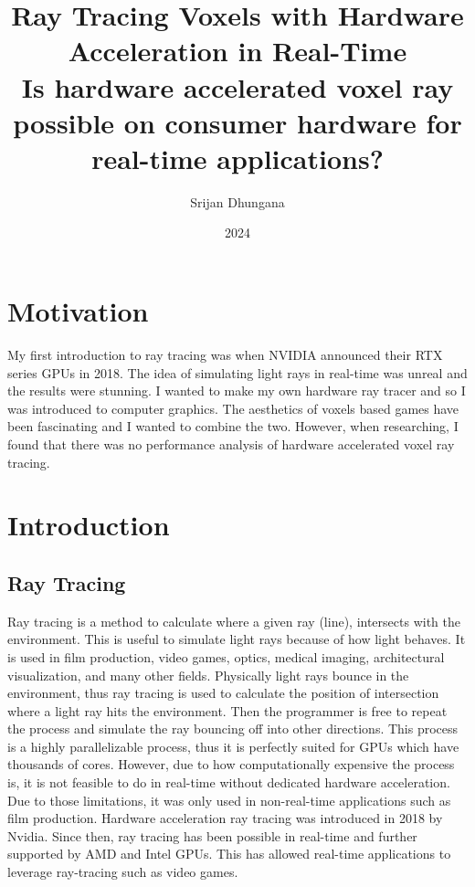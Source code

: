 \documentclass[12pt]{article}
\title{Ray Tracing Voxels with Hardware Acceleration in Real-Time \\
    \vspace{1cm}
    \large Is hardware accelerated voxel ray possible on consumer hardware for real-time applications?}
\author{Srijan Dhungana}
\date{2024}
\begin{document}
\maketitle
\clearpage

\tableofcontents
\clearpage


\clearpage

\section{Motivation}

My first introduction to ray tracing was when NVIDIA announced their RTX series GPUs in 2018.
The idea of simulating light rays in real-time was unreal and the results were stunning.
I wanted to make my own hardware ray tracer and so I was introduced to computer graphics.
The aesthetics of voxels based games have been fascinating and I wanted to combine the two.
However, when researching, I found that there was no performance analysis of hardware accelerated voxel ray tracing.

\section{Introduction}

\subsection{Ray Tracing}

Ray tracing is a method to calculate where a given ray (line), intersects
with the environment. This is useful to simulate light rays because of how light behaves. It is used in film
production, video games, optics, medical imaging, architectural visualization,
and many other fields. Physically light rays bounce in the environment, thus
ray tracing is used to calculate the position of intersection where a light ray
hits the environment. Then the programmer is free to repeat the process
and simulate the ray bouncing off into other directions. This process is a
highly parallelizable process, thus it is perfectly suited for GPUs which have
thousands of cores. However, due to how computationally expensive the
process is, it is not feasible to do in real-time without dedicated hardware
acceleration. Due to those limitations, it was only used in non-real-time
applications such as film production. Hardware acceleration ray tracing was introduced in 2018 by Nvidia.
Since then, ray tracing has been possible in real-time and further supported by AMD and
Intel GPUs. This has allowed real-time applications to leverage ray-tracing such as video games.
\end{document}
